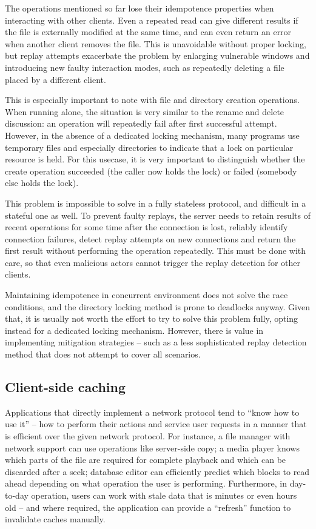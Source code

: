The operations mentioned so far lose their idempotence properties when interacting with other clients. Even
a repeated read can give different results if the file is externally modified at the same time, and can even
return an error when another client removes the file. This is unavoidable without proper locking, but replay
attempts exacerbate the problem by enlarging vulnerable windows and introducing new faulty interaction modes,
such as repeatedly deleting a file placed by a different client.

This is especially important to note with file and directory creation operations. When running alone, the
situation is very similar to the rename and delete discussion: an operation will repeatedly fail after first
successful attempt. However, in the absence of a dedicated locking mechanism, many programs use temporary
files and especially directories to indicate that a lock on particular resource is held.  For this usecase, it
is very important to distinguish whether the create operation succeeded (the caller now holds the lock) or
failed (somebody else holds the lock).

This problem is impossible to solve in a fully stateless protocol, and difficult in a stateful one as well. To
prevent faulty replays, the server needs to retain results of recent operations for some time after the
connection is lost, reliably identify connection failures, detect replay attempts on new connections and
return the first result without performing the operation repeatedly. This must be done with care, so that even
malicious actors cannot trigger the replay detection for other clients.

Maintaining idempotence in concurrent environment does not solve the race conditions, and the directory
locking method is prone to deadlocks anyway. Given that, it is usually not worth the effort to try to solve
this problem fully, opting instead for a dedicated locking mechanism. However, there is value in implementing
mitigation strategies -- such as a less sophisticated replay detection method that does not attempt to cover
all scenarios.


\subsection{Client-side caching}

Applications that directly implement a network protocol tend to ``know how to use it'' -- how to perform their
actions and service user requests in a manner that is efficient over the given network protocol. For instance,
a file manager with network support can use operations like server-side copy; a media player knows which parts
of the file are required for complete playback and which can be discarded after a seek; database editor can
efficiently predict which blocks to read ahead depending on what operation the user is performing.
Furthermore, in day-to-day operation, users can work with stale data that is minutes or even hours old -- and
where required, the application can provide a ``refresh'' function to invalidate caches manually.

